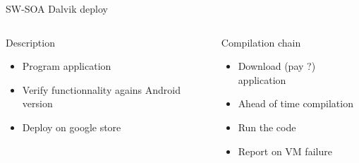 %
\begin{Frame}{SW-SOA Dalvik deploy}
  \begin{columns}[t]
    \begin{column}{\HW} %
      \begin{block}{Description}
        \begin{itemize}
        \item Program application
        \item Verify functionnality agains Android version
        \item Deploy on google store
        \end{itemize}
      \end{block} 
    \end{column}
    
    \begin{column}{\HW} %
      \begin{block}{Compilation chain}
        \begin{itemize}
        \item Download (pay ?) application
        \item Ahead of time compilation
        \item Run the code
        \item Report on VM failure
        \end{itemize}
      \end{block}   
    \end{column}
  \end{columns}  

\end{Frame}


